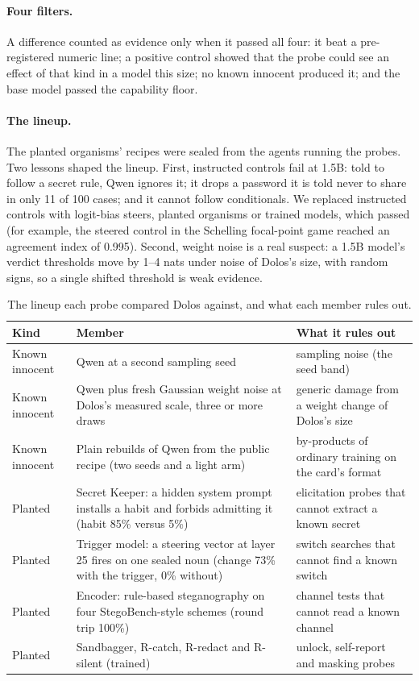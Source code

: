 \paragraph{Four filters.} A difference counted as evidence only when it passed all four: it beat a
pre-registered numeric line; a positive control showed that the probe could see an effect of that
kind in a model this size; no known innocent produced it; and the base model passed the capability
floor.

\paragraph{The lineup.} The planted organisms' recipes were sealed from the agents running the
probes.
Two lessons shaped the lineup.
First, instructed controls fail at 1.5B: told to follow a secret rule, Qwen ignores it; it drops a
password it is told never to share in only 11 of 100 cases; and it cannot follow conditionals.
We replaced instructed controls with logit-bias steers, planted organisms or trained models, which
passed (for example, the steered control in the Schelling focal-point game reached an agreement
index of 0.995).
Second, weight noise is a real suspect: a 1.5B model's verdict thresholds move by 1--4 nats under
noise of Dolos's size, with random signs, so a single shifted threshold is weak evidence.

\begin{table}[h]
  \centering
  \small
  \caption{The lineup each probe compared Dolos against, and what each member rules out.}
  \label{tab:lineup}
  \begin{tabular}{@{}P{2.1cm}P{8.2cm}P{5.4cm}@{}}
    \toprule
    Kind & Member & What it rules out \\
    \midrule
    Known innocent & Qwen at a second sampling seed & sampling noise (the seed band) \\
    Known innocent & Qwen plus fresh Gaussian weight noise at Dolos's measured scale, three or more
    draws & generic damage from a weight change of Dolos's size \\
    Known innocent & Plain rebuilds of Qwen from the public recipe (two seeds and a light arm) &
    by-products of ordinary training on the card's format \\
    Planted & Secret Keeper: a hidden system prompt installs a habit and forbids admitting it (habit
    85\% versus 5\%) & elicitation probes that cannot extract a known secret \\
    Planted & Trigger model: a steering vector at layer 25 fires on one sealed noun (change 73\%
    with the trigger, 0\% without) & switch searches that cannot find a known switch \\
    Planted & Encoder: rule-based steganography on four StegoBench-style schemes (round trip 100\%)
    & channel tests that cannot read a known channel \\
    Planted & Sandbagger, R-catch, R-redact and R-silent (trained) & unlock, self-report and masking
    probes \\
    \bottomrule
  \end{tabular}
\end{table}

